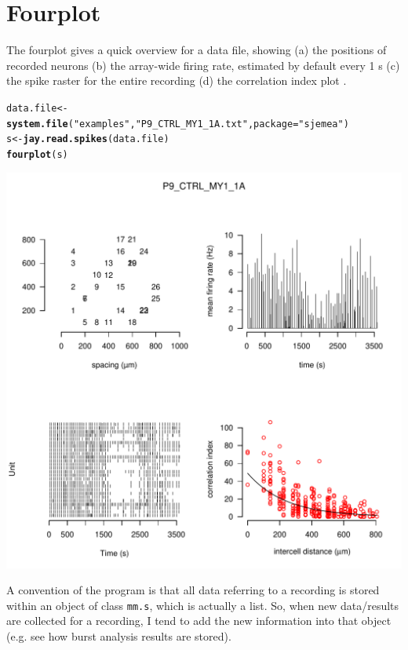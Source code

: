 \documentclass{article}\usepackage[]{graphicx}\usepackage[]{color}
\makeatletter
\def\maxwidth{ %
  \ifdim\Gin@nat@width>\linewidth
    \linewidth
  \else
    \Gin@nat@width
  \fi
}
\newcommand{\hlstr}[1]{\textcolor[rgb]{0.192,0.494,0.8}{#1}}%
\newcommand{\hlkwd}[1]{\textcolor[rgb]{0.737,0.353,0.396}{\textbf{#1}}}%
\newenvironment{kframe}{%
 \def\at@end@of@kframe{}%
 \ifinner\ifhmode%
  \def\at@end@of@kframe{\end{minipage}}%
  \begin{minipage}{\columnwidth}%
 \fi\fi%
 \def\FrameCommand##1{\hskip\@totalleftmargin \hskip-\fboxsep
 \colorbox{shadecolor}{##1}\hskip-\fboxsep
     \hskip-\linewidth \hskip-\@totalleftmargin \hskip\columnwidth}%
 \MakeFramed {\advance\hsize-\width
   \@totalleftmargin\z@ \linewidth\hsize
   \@setminipage}}%
 {\par\unskip\endMakeFramed%
 \at@end@of@kframe}
\newenvironment{knitrout}{}{} %
\makeatother
\begin{document}
\section*{Fourplot}

The fourplot gives a quick overview for a data file, showing (a) the
positions of recorded neurons (b) the array-wide firing rate,
estimated by default every 1 s (c) the spike raster for the entire
recording (d) the correlation index plot \citep{Wong1993}.

\begin{knitrout}
\color{fgcolor}\begin{kframe}
\begin{alltt}
data.file <- \hlkwd{system.file}(\hlstr{"examples"}, \hlstr{"P9_CTRL_MY1_1A.txt"}, package = \hlstr{"sjemea"})
s <- \hlkwd{jay.read.spikes}(data.file)
\hlkwd{fourplot}(s)
\end{alltt}


{\ttfamily\noindent\color{warningcolor}{\#\# Warning: removing 17 zero entries}}\end{kframe}
\includegraphics[width=\maxwidth]{figure/unnamed-chunk-1} 

\end{knitrout}


A convention of the program is that all data referring to a recording
is stored within an object of class \texttt{mm.s}, which is actually a
list.  So, when new data/results are collected for a recording, I tend
to add the new information into that object (e.g. see how burst
analysis results are stored).
\end{document}
